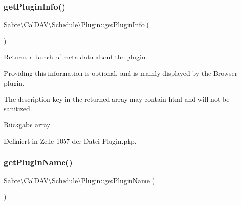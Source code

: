 \mbox{\label{class_sabre_1_1_cal_d_a_v_1_1_schedule_1_1_plugin_a989aba96689cf98bcb97f71fa5eb5bf3}} 
\subsubsection{\texorpdfstring{get\+Plugin\+Info()}{getPluginInfo()}}
{\footnotesize\ttfamily Sabre\textbackslash{}\+Cal\+D\+A\+V\textbackslash{}\+Schedule\textbackslash{}\+Plugin\+::get\+Plugin\+Info (\begin{DoxyParamCaption}{ }\end{DoxyParamCaption})}

Returns a bunch of meta-\/data about the plugin.

Providing this information is optional, and is mainly displayed by the Browser plugin.

The description key in the returned array may contain html and will not be sanitized.

\begin{DoxyReturn}{Rückgabe}
array 
\end{DoxyReturn}


Definiert in Zeile 1057 der Datei Plugin.\+php.

\mbox{\label{class_sabre_1_1_cal_d_a_v_1_1_schedule_1_1_plugin_a2b408ffca42fade002db71d49b8d23d1}} 
\subsubsection{\texorpdfstring{get\+Plugin\+Name()}{getPluginName()}}
{\footnotesize\ttfamily Sabre\textbackslash{}\+Cal\+D\+A\+V\textbackslash{}\+Schedule\textbackslash{}\+Plugin\+::get\+Plugin\+Name (\begin{DoxyParamCaption}{ }\end{DoxyParamCaption})}


